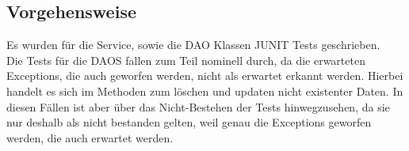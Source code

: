 \documentclass[fontsize=12pt,paper=a4,twoside]{scrartcl}
\begin{document}
\subsection{Vorgehensweise}
Es wurden für die Service, sowie die DAO Klassen JUNIT Tests geschrieben. \\
Die Tests für die DAOS fallen zum Teil nominell durch, da die erwarteten Exceptions, die auch geworfen werden, nicht als erwartet erkannt werden. Hierbei handelt es sich im Methoden zum löschen und updaten nicht existenter Daten. In diesen Fällen ist aber über das Nicht-Bestehen der Tests hinwegzusehen, da sie nur deshalb als nicht bestanden gelten, weil genau die Exceptions geworfen werden, die auch erwartet werden. \\
\end{document}
